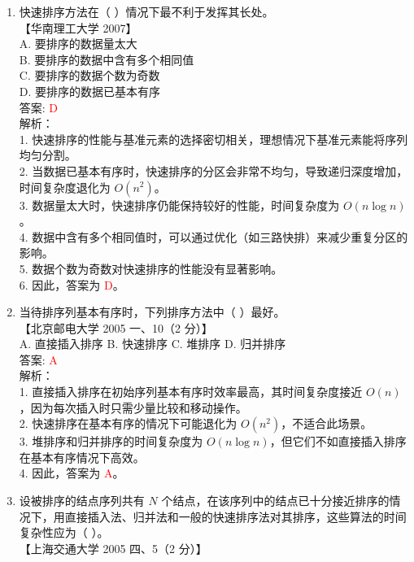 \documentclass[lang=cn,newtx,10pt,scheme=chinese]{../../../elegantbook}
\begin{document}
\begin{enumerate}
    \item 快速排序方法在（ ）情况下最不利于发挥其长处。\\
    【华南理工大学 2007】\\

    A. 要排序的数据量太大 \\  
    B. 要排序的数据中含有多个相同值 \\  
    C. 要排序的数据个数为奇数 \\  
    D. 要排序的数据已基本有序 \\

    答案: \textcolor{red}{D} \\

    解析：\\
    1. 快速排序的性能与基准元素的选择密切相关，理想情况下基准元素能将序列均匀分割。\\
    2. 当数据已基本有序时，快速排序的分区会非常不均匀，导致递归深度增加，时间复杂度退化为 $O(n^2)$。\\
    3. 数据量太大时，快速排序仍能保持较好的性能，时间复杂度为 $O(n \log n)$。\\
    4. 数据中含有多个相同值时，可以通过优化（如三路快排）来减少重复分区的影响。\\
    5. 数据个数为奇数对快速排序的性能没有显著影响。\\
    6. 因此，答案为 \textcolor{red}{D}。\\

    \item 当待排序列基本有序时，下列排序方法中（ ）最好。\\
    【北京邮电大学 2005 一、10（2 分）】\\

    A. 直接插入排序 \quad B. 快速排序 \quad C. 堆排序 \quad D. 归并排序 \\

    答案: \textcolor{red}{A} \\

    解析：\\
    1. 直接插入排序在初始序列基本有序时效率最高，其时间复杂度接近 $O(n)$，因为每次插入时只需少量比较和移动操作。\\
    2. 快速排序在基本有序的情况下可能退化为 $O(n^2)$，不适合此场景。\\
    3. 堆排序和归并排序的时间复杂度为 $O(n \log n)$，但它们不如直接插入排序在基本有序情况下高效。\\
    4. 因此，答案为 \textcolor{red}{A}。\\

    \item 设被排序的结点序列共有 $N$ 个结点，在该序列中的结点已十分接近排序的情况下，用直接插入法、归并法和一般的快速排序法对其排序，这些算法的时间复杂性应为（ ）。\\
    【上海交通大学 2005 四、5（2 分）】\\


\end{enumerate}
\end{document}
